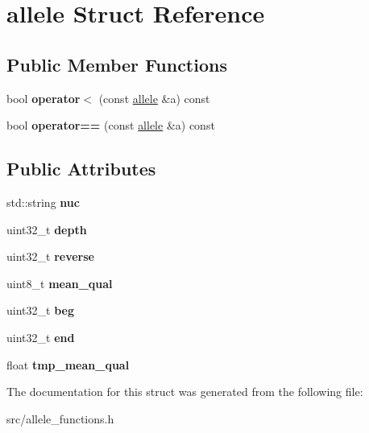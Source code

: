 \hypertarget{structallele}{}\section{allele Struct Reference}
\label{structallele}
\subsection*{Public Member Functions}
\begin{DoxyCompactItemize}
\item 
\mbox{\label{structallele_a502cacd33b94d11fa9115e9c10fd5cfa}} 
bool {\bfseries operator$<$} (const \mbox{\hyperlink{structallele}{allele}} \&a) const
\item 
\mbox{\label{structallele_a024eb5a0fa32f0b8ada7c0fa161c922a}} 
bool {\bfseries operator==} (const \mbox{\hyperlink{structallele}{allele}} \&a) const
\end{DoxyCompactItemize}
\subsection*{Public Attributes}
\begin{DoxyCompactItemize}
\item 
\mbox{\label{structallele_a2d7d7e7ab126f0881e8a43efdfef9532}} 
std\+::string {\bfseries nuc}
\item 
\mbox{\label{structallele_aa1d12eec365c400a111ed2e985eec0b2}} 
uint32\+\_\+t {\bfseries depth}
\item 
\mbox{\label{structallele_af6966ddc48e2badf26b335f1b1117572}} 
uint32\+\_\+t {\bfseries reverse}
\item 
\mbox{\label{structallele_a17706ec2e654e9d204df2c1a5e339ecd}} 
uint8\+\_\+t {\bfseries mean\+\_\+qual}
\item 
\mbox{\label{structallele_ac36e3baa57a1260c3341665c6a154dff}} 
uint32\+\_\+t {\bfseries beg}
\item 
\mbox{\label{structallele_a0a45a966a4ece36f7ff976ad0acfd522}} 
uint32\+\_\+t {\bfseries end}
\item 
\mbox{\label{structallele_a78d589bef95df9b22e506d880e9179a2}} 
float {\bfseries tmp\+\_\+mean\+\_\+qual}
\end{DoxyCompactItemize}


The documentation for this struct was generated from the following file\+:\begin{DoxyCompactItemize}
\item 
src/allele\+\_\+functions.\+h\end{DoxyCompactItemize}
